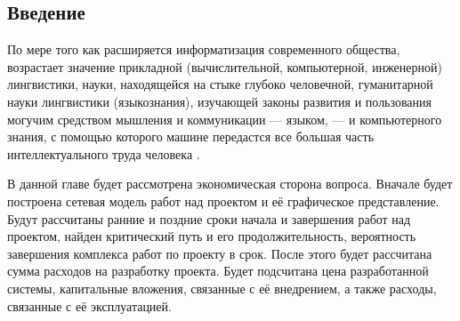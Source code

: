 
\subsection{Введение}

По мере того как расширяется информатизация современного общества, 
возрастает значение прикладной (вычислительной, компьютерной, инженерной) 
лингвистики, науки, находящейся на стыке глубоко человечной, гуманитарной 
науки лингвистики (языкознания), изучающей законы развития 
и пользования могучим средством мышления и коммуникации --- языком, --- 
и компьютерного знания, с помощью которого машине передастся 
все большая часть интеллектуального труда человека \cite{Марчук:2000}.

В данной главе будет рассмотрена экономическая сторона вопроса. 
Вначале будет построена сетевая модель работ над проектом и её графическое представление. 
Будут рассчитаны ранние и поздние сроки начала и завершения работ над проектом, 
найден критический путь и его продолжительность, вероятность завершения 
комплекса работ по проекту в срок. После этого будет рассчитана сумма 
расходов на разработку проекта. Будет подсчитана цена разработанной системы, 
капитальные вложения, связанные с её внедрением, а также расходы, 
связанные с её эксплуатацией.

